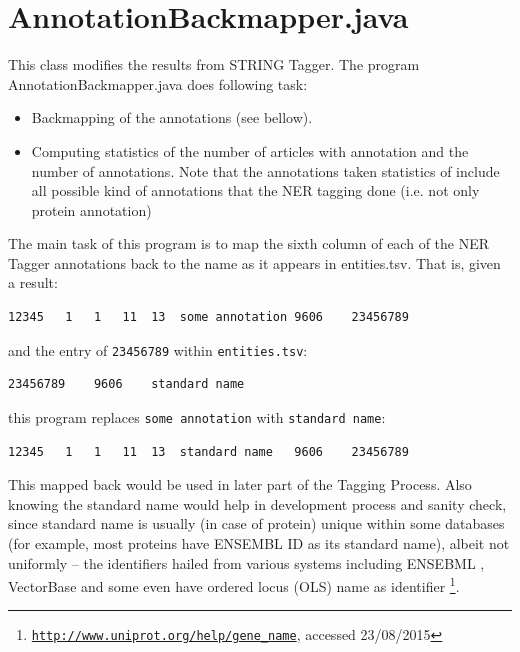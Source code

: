 \section{AnnotationBackmapper.java}

\label{sec:AnnotationBackmapper}

This class modifies the results from STRING Tagger. The program AnnotationBackmapper.java does following task:

\begin{itemize}
\item Backmapping of the annotations (see bellow).
\item Computing statistics of the number of articles with annotation and the number of annotations. Note that the annotations taken statistics of include all possible kind of annotations that the NER tagging done (i.e. not only protein annotation)
\end{itemize}

The main task of this program is to map the sixth column of each of the NER Tagger annotations back to the name as it appears in entities.tsv. That is, given a result:

\begin{lstlisting}[breaklines]
12345	1	1	11	13	some annotation	9606	23456789
\end{lstlisting}

and the entry of \texttt{23456789} within \texttt{entities.tsv}:

\begin{lstlisting}[breaklines]
23456789	9606	standard name
\end{lstlisting}

this program replaces \texttt{some annotation} with \texttt{standard name}:

\begin{lstlisting}[breaklines]
12345	1	1	11	13	standard name	9606	23456789
\end{lstlisting}

This mapped back would be used in later part of the Tagging Process. Also knowing the standard name would help in development process and sanity check, since standard name is usually (in case of protein) unique within some databases (for example, most proteins have ENSEMBL ID as its standard name), albeit not uniformly -- the identifiers hailed from various systems including ENSEBML \citep{hubbard2002ensembl}, VectorBase \citep{lawson2009vectorbase} and some even have ordered locus (OLS) name as identifier \footnote{\href{http://www.uniprot.org/help/gene_name}{\texttt{http://www.uniprot.org/help/gene\_name}}, accessed 23/08/2015}.

